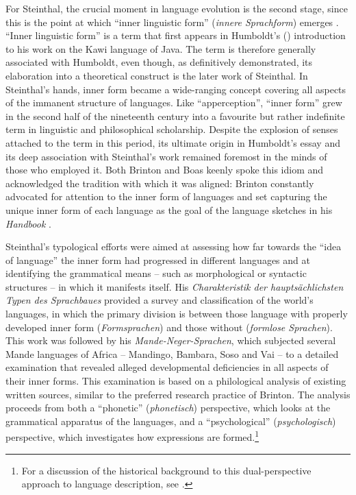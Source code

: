 \documentclass[output=paper]{langscibook}
\begin{document}
For Steinthal, the crucial moment in language evolution is the second stage, since this is the point at which ``inner linguistic form'' (\emph{innere Sprachform}) emerges \citep[425--426]{Steinthal1881}. ``Inner linguistic form'' is a term that first appears in Humboldt's (\citeyear{Humboldt19981836}) introduction to his work on the Kawi language of Java. The term is therefore generally associated with Humboldt, even though, as \citet{Borsche1989} definitively demonstrated, its elaboration into a theoretical construct is the later work of Steinthal. In Steinthal's hands, inner form became a wide-ranging concept covering all aspects of the immanent structure of languages. Like ``apperception'', ``inner form'' grew in the second half of the nineteenth century into a favourite but rather indefinite term in linguistic and philosophical scholarship. Despite the explosion of senses attached to the term in this period, its ultimate origin in Humboldt's essay and its deep association with Steinthal's work remained foremost in the minds of those who employed it. Both Brinton and Boas keenly spoke this idiom and acknowledged the tradition with which it was aligned: Brinton constantly advocated for attention to the inner form of languages and \citet[81]{Boas1911} set capturing the unique inner form of each language as the goal of the language sketches in his \emph{Handbook} \citep[cf.][98--105]{Darnell1988}. 

Steinthal's typological efforts were aimed at assessing how far towards the ``idea of language'' the inner form had progressed in different languages and at identifying the grammatical means -- such as morphological or syntactic structures -- in which it manifests itself. His \citeyear{Steinthal1860} \emph{Charakteristik der hauptsächlichsten Typen des Sprachbaues} provided a survey and classification of the world's languages, in which the primary division is between those language with properly developed inner form (\emph{Formsprachen}) and those without (\emph{formlose Sprachen}). This work was followed by his \citeyear{Steinthal1867} \emph{Mande-Neger-Sprachen}, which subjected several Mande languages of Africa -- Mandingo, Bambara, Soso and Vai -- to a detailed examination that revealed alleged developmental deficiencies in all aspects of their inner forms. This examination is based on a philological analysis of existing written sources, similar to the preferred research practice of Brinton. The analysis proceeds from both a ``phonetic'' (\emph{phonetisch}) perspective, which looks at the grammatical apparatus of the languages, and a ``psychological'' (\emph{psychologisch}) perspective, which investigates how expressions are formed.\footnote{For a discussion of the historical background to this dual-perspective approach to language description, see \citet[2--6]{McElvenny2017}.}
\end{document}
